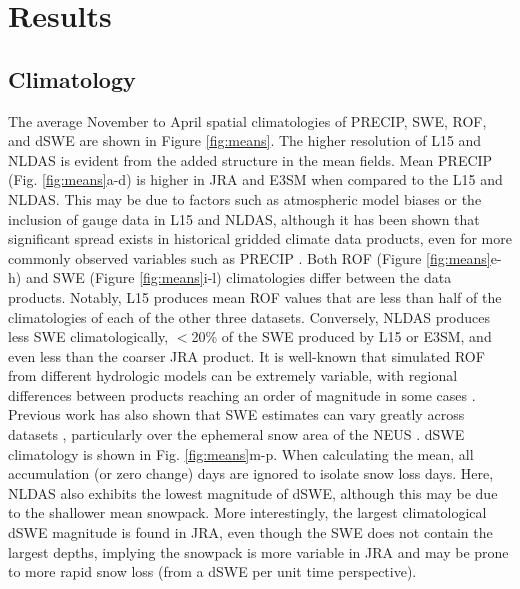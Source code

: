 \documentclass[nhess, manuscript]{copernicus}
\begin{document}

\section{Results}

\subsection{Climatology}

The average November to April spatial climatologies of PRECIP, SWE, ROF, and dSWE are shown in Figure \ref{fig:means}. 
The higher resolution of L15 and NLDAS is evident from the added structure in the mean fields. 
Mean PRECIP (Fig. \ref{fig:means}a-d) is higher in JRA and E3SM when compared to the L15 and NLDAS. 
This may be due to factors such as atmospheric model biases or the inclusion of gauge data in L15 and NLDAS, although it has been shown that significant spread exists in historical gridded climate data products, even for more commonly observed variables such as PRECIP \citep{gutmann2012comparison,livneh2014filling,henn2018an}.
Both ROF (Figure \ref{fig:means}e-h) and SWE (Figure \ref{fig:means}i-l) climatologies differ between the data products. 
Notably, L15 produces mean ROF values that are less than half of the climatologies of each of the other three datasets. 
Conversely, NLDAS produces less SWE climatologically, $<$20\% of the SWE produced by L15 or E3SM, and even less than the coarser JRA product. 
It is well-known that simulated ROF from different hydrologic models can be extremely variable, with regional differences between products reaching an order of magnitude in some cases \citep{gudmundsson2012comparing,sood2015global,beck2017global}. 
Previous work has also shown that SWE estimates can vary greatly across datasets \citep{lundquist2015high,Rhoades2018a}, particularly over the ephemeral snow area of the NEUS \citep{mccrary2017evaluation,mccrary2022projections}. 
dSWE climatology is shown in Fig. \ref{fig:means}m-p.
When calculating the mean, all accumulation (or zero change) days are ignored to isolate snow loss days. 
Here, NLDAS also exhibits the lowest magnitude of dSWE, although this may be due to the shallower mean snowpack. 
More interestingly, the largest climatological dSWE magnitude is found in JRA, even though the SWE does not contain the largest depths, implying the snowpack is more variable in JRA and may be prone to more rapid snow loss (from a dSWE per unit time perspective).
\end{document}

